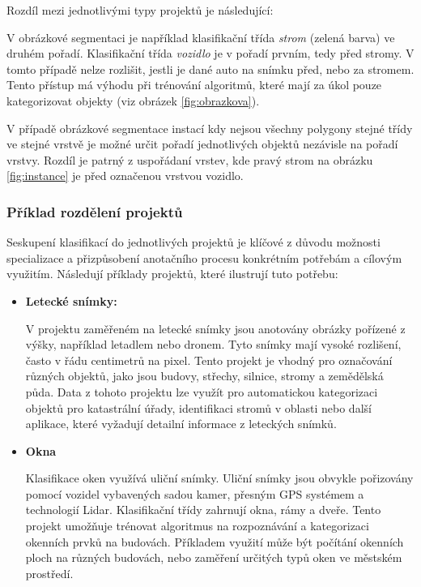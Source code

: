 Rozdíl mezi jednotlivými typy projektů je následující:

V obrázkové segmentaci je například klasifikační třída \textit{strom} (zelená barva) ve druhém pořadí. Klasifikační třída \textit{vozidlo} je v pořadí prvním, tedy před stromy. V tomto případě nelze rozlišit, jestli je dané auto na snímku před, nebo za stromem. Tento přístup má výhodu při trénování algoritmů, které mají za úkol pouze kategorizovat objekty (viz obrázek \vref{fig:obrazkova}). 

V případě obrázkové segmentace instací kdy nejsou všechny polygony stejné třídy ve stejné vrstvě je možné určit pořadí jednotlivých objektů nezávisle na pořadí vrstvy. Rozdíl je patrný z uspořádaní vrstev, kde pravý strom na obrázku \vref{fig:instance} je před označenou vrstvou vozidlo.



\subsubsection{Příklad rozdělení projektů}
Seskupení klasifikací do jednotlivých projektů je klíčové z důvodu možnosti specializace a přizpůsobení anotačního procesu konkrétním potřebám a cílovým využitím. Následují příklady projektů, které ilustrují tuto potřebu:

\begin{itemize}
  \item \textbf{Letecké snímky:}
  
  V projektu zaměřeném na letecké snímky jsou anotovány obrázky pořízené z výšky, například letadlem nebo dronem. Tyto snímky mají vysoké rozlišení, často v řádu centimetrů na pixel. Tento projekt je vhodný pro označování různých objektů, jako jsou budovy, střechy, silnice, stromy a zemědělská půda. Data z tohoto projektu lze využít pro automatickou kategorizaci objektů pro katastrální úřady, identifikaci stromů v oblasti nebo další aplikace, které vyžadují detailní informace z leteckých snímků.
  
  \item \textbf{Okna}
  
  Klasifikace oken využívá uliční snímky. Uliční snímky jsou obvykle pořizovány pomocí vozidel vybavených sadou kamer, přesným GPS systémem a technologií Lidar. Klasifikační třídy zahrnují okna, rámy a dveře. Tento projekt umožňuje trénovat algoritmus na rozpoznávání a kategorizaci okenních prvků na budovách. Příkladem využití může být počítání okenních ploch na různých budovách, nebo zaměření určitých typů oken ve městském prostředí.
\end{itemize}

